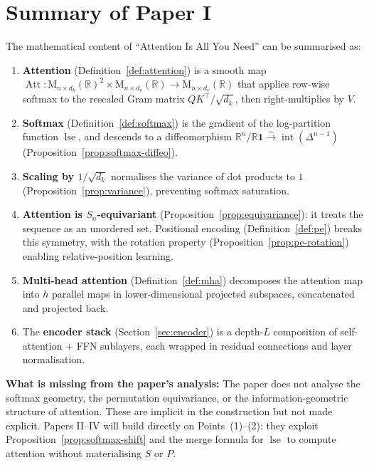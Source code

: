 \documentclass[11pt]{amsart}
\theoremstyle{plain}
\theoremstyle{definition}
\newcommand{\R}{\mathbb{R}}
\newcommand{\Mat}[2]{\mathrm{M}_{#1 \times #2}(\R)}
\newcommand{\simplex}[1]{\Delta^{#1}}   %
\newcommand{\logsumexp}{\operatorname{lse}}
\newcommand{\Att}{\operatorname{Att}}
\begin{document}
\section{Summary of Paper I}
\label{sec:summary-1}

The mathematical content of ``Attention Is All You Need'' can be summarised as:

\begin{enumerate}[label=(\arabic*)]
    \item \textbf{Attention} (Definition~\ref{def:attention}) is a smooth map
    $\Att : \Mat{n}{d_k}^2 \times \Mat{n}{d_v} \to \Mat{n}{d_v}$
    that applies row-wise softmax to the rescaled Gram matrix $QK^\top/\sqrt{d_k}$,
    then right-multiplies by $V$.

    \item \textbf{Softmax} (Definition~\ref{def:softmax}) is the gradient of
    the log-partition function $\logsumexp$, and descends to a diffeomorphism
    $\R^n/\R\mathbf{1} \xrightarrow{\sim} \operatorname{int}(\simplex{n-1})$
    (Proposition~\ref{prop:softmax-diffeo}).

    \item \textbf{Scaling by $1/\sqrt{d_k}$} normalises the variance of dot
    products to $1$ (Proposition~\ref{prop:variance}), preventing softmax
    saturation.

    \item \textbf{Attention is $S_n$-equivariant}
    (Proposition~\ref{prop:equivariance}): it treats the sequence as an
    unordered set.  Positional encoding (Definition~\ref{def:pe}) breaks this
    symmetry, with the rotation property
    (Proposition~\ref{prop:pe-rotation}) enabling relative-position learning.

    \item \textbf{Multi-head attention} (Definition~\ref{def:mha}) decomposes
    the attention map into $h$ parallel maps in lower-dimensional projected
    subspaces, concatenated and projected back.

    \item The \textbf{encoder stack} (Section~\ref{sec:encoder}) is a depth-$L$
    composition of self-attention + FFN sublayers, each wrapped in residual
    connections and layer normalisation.
\end{enumerate}

\bigskip
\noindent\textbf{What is missing from the paper's analysis:}
The paper does not analyse the softmax geometry, the permutation equivariance,
or the information-geometric structure of attention.  These are implicit in the
construction but not made explicit.  Papers II--IV will build directly on
Points~(1)--(2): they exploit
Proposition~\ref{prop:softmax-shift} and the merge formula for
$\logsumexp$ to compute attention without materialising $S$ or $P$.
\end{document}
